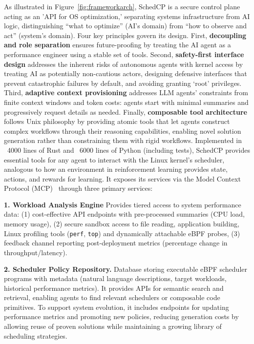\documentclass[preprint]{article}
\newcommand{\sys}{SchedCP\xspace}
\begin{document}
As illustrated in Figure~\ref{fig:frameworkarch}, \sys is a secure control plane acting as an 'API for OS optimization,' separating systems infrastructure from AI logic, distinguishing ``what to optimize'' (AI's domain) from ``how to observe and act'' (system's domain). Four key principles govern its design. First, \textbf{decoupling and role separation} ensures future-proofing by treating the AI agent as a performance engineer using a stable set of tools. Second, \textbf{safety-first interface design} addresses the inherent risks of autonomous agents with kernel access by treating AI as potentially non-cautious actors, designing defensive interfaces that prevent catastrophic failures by default, and avoiding granting `root' privileges. Third, \textbf{adaptive context provisioning} addresses LLM agents' constraints from finite context windows and token costs: agents start with minimal summaries and progressively request details as needed. Finally, \textbf{composable tool architecture} follows Unix philosophy by providing atomic tools that let agents construct complex workflows through their reasoning capabilities, enabling novel solution generation rather than constraining them with rigid workflows. Implemented in ~4000 lines of Rust and ~6000 lines of Python (including tests), \sys provides essential tools for any agent to interact with the Linux kernel's scheduler, analogous to how an environment in reinforcement learning provides state, actions, and rewards for learning. It exposes its services via the Model Context Protocol (MCP)~\cite{anthropic2024mcp} through three primary services:


\textbf{1. Workload Analysis Engine} Provides tiered access to system performance data: (1) cost-effective API endpoints with pre-processed summaries (CPU load, memory usage), (2) secure sandbox access to file reading, application building, Linux profiling tools (\texttt{perf}, \texttt{top}) and dynamically attachable eBPF probes, (3) feedback channel reporting post-deployment metrics (percentage change in throughput/latency).

\textbf{2. Scheduler Policy Repository.} Database storing executable eBPF scheduler programs with metadata (natural language descriptions, target workloads, historical performance metrics). It provides APIs for semantic search and retrieval, enabling agents to find relevant schedulers or composable code primitives. To support system evolution, it includes endpoints for updating performance metrics and promoting new policies, reducing generation costs by allowing reuse of proven solutions while maintaining a growing library of scheduling strategies.
\end{document}
